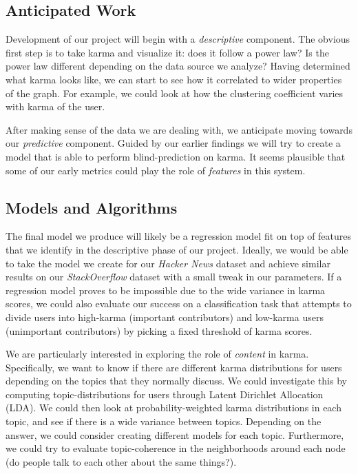 \documentclass[10pt]{article}
\begin{document}
\subsection{Anticipated Work}
Development of our project will begin with a \textit{descriptive} component. The
obvious first step is to take karma and visualize it: does it follow a power
law?  Is the power law different depending on the data source we analyze? Having
determined what karma looks like, we can start to see how it correlated to wider
properties of the graph. For example, we could look at how the clustering
coefficient varies with karma of the user.

After making sense of the data we are dealing with, we anticipate moving towards
our \textit{predictive} component. Guided by our earlier findings we will try to
create a model that is able to perform blind-prediction on karma. It seems
plausible that some of our early metrics could play the role of
\textit{features} in this system.

\subsection{Models and Algorithms}
\label{sec:models}
The final model we produce will likely be a regression model fit on top of
features that we identify in the descriptive phase of our project. Ideally, we
would be able to take the model we create for our \textit{Hacker News} dataset
and achieve similar results on our \textit{StackOverflow} dataset with a small tweak
in our parameters. If a regression model proves to be impossible due to the wide
variance in karma scores, we could also evaluate our success on a classification
task that attempts to divide users into high-karma (important contributors) and
low-karma users (unimportant contributors) by picking a fixed threshold of karma
scores.

We are particularly interested in exploring the role of \textit{content} in
karma. Specifically, we want to know if there are different karma distributions
for users depending on the topics that they normally discuss. We could
investigate this by computing topic-distributions for users through Latent
Dirichlet Allocation (LDA). We could then look at probability-weighted karma
distributions in each topic, and see if there is a wide variance between topics.
Depending on the answer, we could consider creating different models for each
topic. Furthermore, we could try to evaluate topic-coherence in the
neighborhoods around each node (do people talk to each other about the same
things?).
\end{document}
